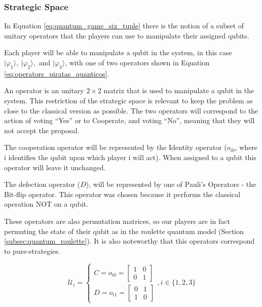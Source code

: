 \subsubsection{Strategic Space}
\label{subsec:strategic_space}

In Equation \ref{eq:quantum_game_six_tuple} there is the notion of a subset of unitary operators that the players can use to manipulate their assigned qubits. 

Each player will be able to manipulate a qubit in the system, in this case $\vert\varphi_{1}\rangle,\:\vert\varphi_{2}\rangle,$ and $\vert\varphi_{3}\rangle$, with one of two operators shown in Equation \ref{eq:operators_piratas_quanticos}. 

An operator is an unitary $2\times2$ matrix that is used to manipulate a qubit in the system.
This restriction of the strategic space is relevant to keep the problem as close to the classical version as possible. The two operators will correspond to the action of voting ``Yes'' or to Cooperate, and voting ``No'', meaning that they will not accept the proposal.  

The cooperation operator will be represented by the Identity operator ($o_{i0}$, where i identifies the qubit upon which player i will act). When assigned to a qubit this operator will leave it unchanged. 

The defection operator ($D$), will be represented by one of Pauli's Operators - the Bit-flip operator. This operator was chosen because it performs the classical operation NOT on a qubit.

These operators are also permutation matrices, so our players are in fact permuting the state of their qubit as in the roulette quantum model (Section \ref{subsec:quantum_roulette}). It is also noteworthy that this operators correspond to pure-strategies.

\begin{equation}
\label{eq:operators_piratas_quanticos}
\mathcal{U}_{i} = \begin{cases}
C = o_{i0}=\left[\begin{array}{cc}
1 & 0\\
0 & 1
\end{array}\right]\\
D = o_{i1}=\left[\begin{array}{cc}
0 & 1\\
1 & 0
\end{array}\right]
\end{cases} , i \in \{ 1, 2, 3 \}
\end{equation}

